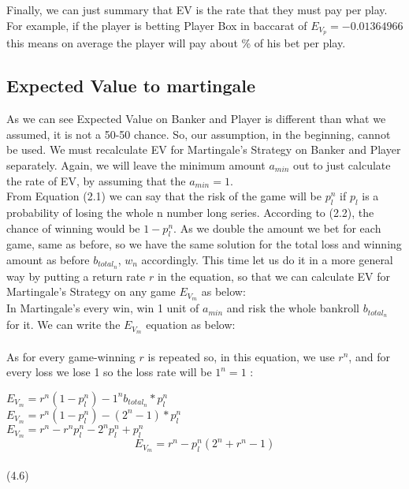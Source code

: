 \documentclass{article}
\begin{document}
Finally, we can just summary that EV is the rate that they must pay per play.  For example, if the player is betting Player Box in baccarat of $E_{V_p}=-0.01364966$ this means on average the player will pay about \% of his bet per play.\\

\subsection{Expected Value to martingale}

As we can see Expected Value on Banker and Player is different than what we assumed, it is not a 50-50 chance.  So, our assumption, in the beginning, cannot be used.  We must recalculate EV for Martingale's Strategy on Banker and Player separately.  Again, we will leave the minimum amount $a_{min}$ out to just calculate the rate of EV, by assuming that the $a_{min}=1$.\\

From Equation (2.1) we can say that the risk of the game will be $p_l^n$ if $p_l$ is a probability of losing the whole n number long series.  According to (2.2), the chance of winning would be $1-p_l^n$.  As we double the amount we bet for each game, same as before, so we have the same solution for the total loss and winning amount as before $b_{total_n}$, $w_n$ accordingly. This time let us do it in a more general way by putting a return rate $r$ in the equation, so that we can calculate EV for Martingale's Strategy on any game $E_{V_m}$ as below: \\

In Martingale's every win, win 1 unit of $a_{min}$ and risk the whole bankroll $b_{total_n}$ for it.  We can write the $E_{V_m}$ equation as below:\\ \\
As for every game-winning $r$ is repeated so, in this equation, we use $r^n$, and for every loss we lose 1 so the loss rate will be $1^n=1$ :\par 
\begin{center}
$E_{V_m}=r^n(1-p_l^n)-1^nb_{total_n}*p_l^n$\\
$E_{V_m}=r^n(1-p_l^n)-(2^n-1)*p_l^n$\\
$E_{V_m}=r^n-r^np_l^n-2^np_l^n+p_l^n$\\
$$E_{V_m}=r^n-p_l^n(2^n+r^n-1)$$\\
(4.6)\\
\end{center}
\end{document}

